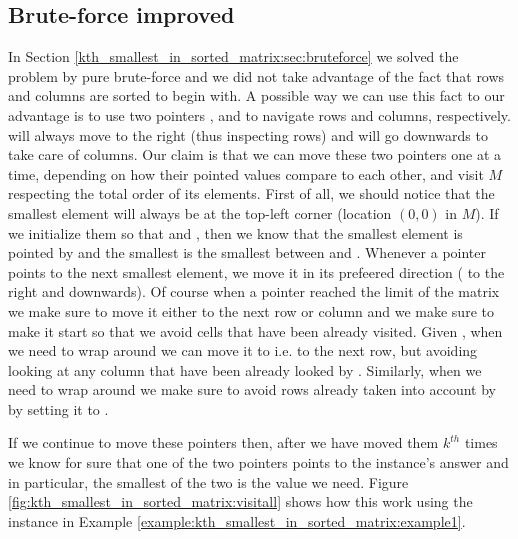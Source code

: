 \subsection{Brute-force improved}
\label{kth_smallest_in_sorted_matrix:sec:bruteforce_constant_space}
In Section \ref{kth_smallest_in_sorted_matrix:sec:bruteforce} we solved the problem by pure brute-force and we did not take advantage of the fact that rows and columns are sorted to begin with. 
A possible way we can use this fact to our advantage is to use two pointers , and  to navigate rows and columns, respectively.  will always move to the right (thus inspecting rows) and  will go downwards to take care of columns. 
Our claim is that we can move these two pointers one at a time, depending on how their pointed values compare to each other, and visit $M$ respecting the total order of its elements.
First of all, we should notice that the smallest element will always be at the top-left corner (location $(0,0)$ in $M$).
If we initialize them so that  and , then we know that the  smallest element is pointed by  and the  smallest is the smallest between   and . Whenever a pointer points to the next smallest element, we move it in its prefeered direction ( to the right and  downwards). Of course when a pointer reached the limit of the matrix we make sure to move it either to the next row or column and we make sure to make it start so that we avoid cells that have been already visited. Given , when we need to wrap around  we can move it to  i.e. to the next row, but avoiding looking at any column that have been already looked by . Similarly, when we need to wrap around  we make sure to avoid rows already taken into account by  by setting it to . 

If we continue to move these pointers then, after we have moved them $k^{th}$ times we know for sure that one of the two pointers points to the instance's answer and in particular, the smallest of the two is the value we need.
Figure \ref{fig:kth_smallest_in_sorted_matrix:visitall} shows how this work using the instance in Example \ref{example:kth_smallest_in_sorted_matrix:example1}.

